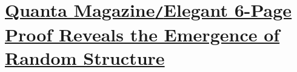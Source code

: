 \documentclass[oneside]{book}
\numberwithin{equation}{section}
\begin{document}
\section{\href{https://www.quantamagazine.org/elegant-six-page-proof-reveals-the-emergence-of-random-structure-20220425/}{Quanta Magazine\texttt{/}Elegant 6-Page Proof Reveals the Emergence of Random Structure}}


\begin{thebibliography}{99}
	\bibitem[]{}
\end{thebibliography}


\printbibliography[heading=bibintoc]
	
\end{document}
